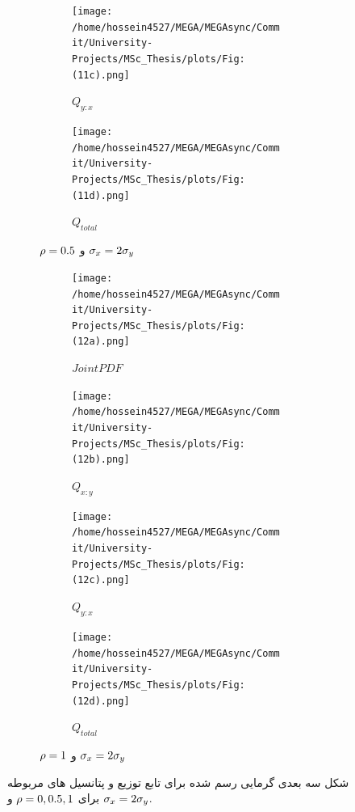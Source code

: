 \documentclass[a4paper,titlepage,12pt,fleqn,oneside]{report}
\begin{document}
\begin{figure}[tbp]
\begin{subfigure}[b]{\textwidth}
\begin{subfigure}[b]{0.24\textwidth}
				\renewcommand\thesubfigure{iii}
				\centering
				\texttt{[image: /home/hossein4527/MEGA/MEGAsync/Commit/University-Projects/MSc\_Thesis/plots/Fig:(11c).png]}
				\caption{$Q_{y:x}$}
				\label{fig:3.2.3}
			\end{subfigure}
			\hfill
			\begin{subfigure}[b]{0.24\textwidth}
				\renewcommand\thesubfigure{iv}
				\centering
				\texttt{[image: /home/hossein4527/MEGA/MEGAsync/Commit/University-Projects/MSc\_Thesis/plots/Fig:(11d).png]}
				\caption{$Q_{total}$}
				\label{fig:3.2.4}
			\end{subfigure}
			\caption{$\protect\rho =0.5$ و $\protect\sigma _{x}=2\protect\sigma _{y}$}
			\label{fig:3.2}
		\end{subfigure}
		\begin{subfigure}[b]{\textwidth}
			\renewcommand\thesubfigure{c}
			\begin{subfigure}[b]{0.24\textwidth}
				\renewcommand\thesubfigure{i}
				\centering
				\texttt{[image: /home/hossein4527/MEGA/MEGAsync/Commit/University-Projects/MSc\_Thesis/plots/Fig:(12a).png]}
				\caption{$Joint PDF$}
				\label{fig:3.3.1}
			\end{subfigure}
			\hfill
			\begin{subfigure}[b]{0.24\textwidth}
				\renewcommand\thesubfigure{ii}
				\centering
				\texttt{[image: /home/hossein4527/MEGA/MEGAsync/Commit/University-Projects/MSc\_Thesis/plots/Fig:(12b).png]}
				\caption{$Q_{x:y}$}
				\label{fig:3.3.2}
			\end{subfigure}
			\hfill
			\begin{subfigure}[b]{0.24\textwidth}
				\renewcommand\thesubfigure{iii}
				\centering
				\texttt{[image: /home/hossein4527/MEGA/MEGAsync/Commit/University-Projects/MSc\_Thesis/plots/Fig:(12c).png]}
				\caption{$Q_{y:x}$}
				\label{fig:3.3.3}
			\end{subfigure}
			\hfill
			\begin{subfigure}[b]{0.24\textwidth}
				\renewcommand\thesubfigure{iv}
				\centering
				\texttt{[image: /home/hossein4527/MEGA/MEGAsync/Commit/University-Projects/MSc\_Thesis/plots/Fig:(12d).png]}
				\caption{$Q_{total}$}
				\label{fig:3.3.4}
			\end{subfigure}		
			\caption{$\protect\rho =1$ و $\protect\sigma _{x}=2\protect\sigma _{y}$}
			\label{fig:3.3}
		\end{subfigure}
		\caption{شکل سه بعدی گرمایی رسم شده برای تابع توزیع و پتانسیل های مربوطه برای
			$\protect\rho =0,0.5,1$ و $\protect\sigma _{x}=2\protect\sigma %
			_{y}$.}
		\label{fig:3t}
	\end{figure}
\end{document}
